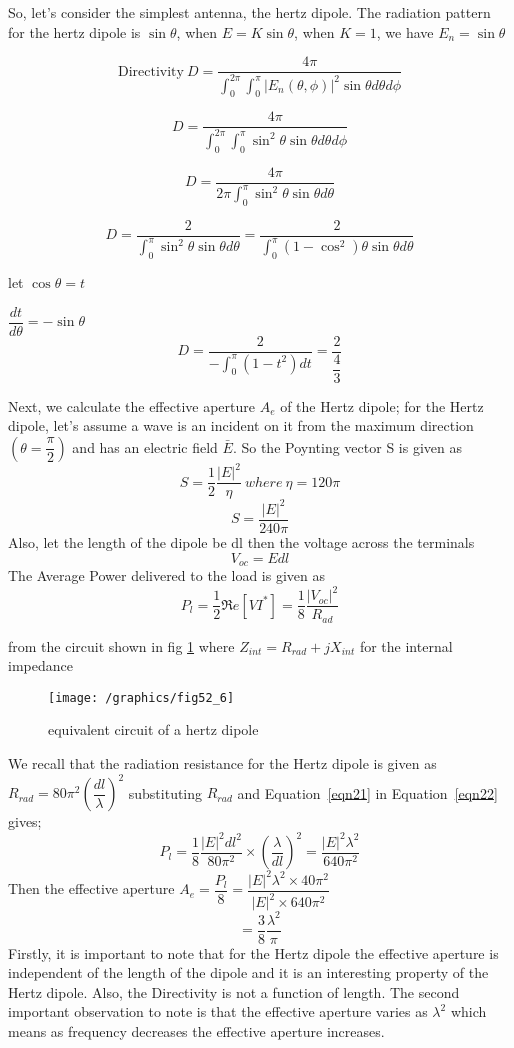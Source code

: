 So, let's consider the simplest antenna, the hertz dipole. The radiation pattern for the hertz dipole is $\sin\theta$, when $E=K\sin\theta$, when $K=1$, we have $E_{n}=\sin\theta$

$$\text{Directivity} \ D=\dfrac{4\pi}{\int_{0}^{2\pi}\int_{0}^{\pi}|E_n(\theta , \phi)|^{2} \sin\theta d\theta d\phi}$$

$$ D=\dfrac{4\pi}{\int_{0}^{2\pi}\int_{0}^{\pi}\sin^{2}\theta \sin\theta d\theta d\phi}$$

$$ D=\dfrac{4\pi}{2\pi\int_{0}^{\pi}\sin^{2}\theta \sin\theta d\theta}$$

$$ D=\dfrac{2}{\int_{0}^{\pi}\sin^{2}\theta \sin\theta d\theta} = \dfrac{2}{\int_{0}^{\pi}(1-\cos^{2})\theta \sin\theta d\theta} $$

let $\cos\theta = t$

$\dfrac{dt}{d\theta}=-\sin\theta$
$$ D=\dfrac{2}{-\int_{0}^{\pi}(1-t^{2})dt} = \dfrac{2}{\dfrac{4}{3}} $$

Next, we calculate the effective aperture $A_{e}$ of the Hertz dipole; for the Hertz dipole, let's assume a wave is an incident on it from the maximum direction $(\theta=\dfrac{\pi}{2})$ and has an electric field $\bar{E}$. So the Poynting vector S is given as 
$$ S= \dfrac{1}{2}\dfrac{|E|^{{2}}}{\eta} \ where \  \eta =120\pi$$
$$ S= \dfrac{|E|^{{2}}}{240\pi}$$
Also, let the length of the dipole be dl then the voltage across the terminals
\begin{equation}
V_{oc}=Edl
\label{eqn21}
\end{equation}
The Average Power delivered to the load is given as
\begin{equation}
P_{l}=\dfrac{1}{2}\Re e [VI^{*}]=\dfrac{1}{8}\dfrac{|V_{oc}|^{2}}{R_{ad}}
\label{eqn22}
\end{equation}

from the circuit shown in fig \ref{fig6} where $Z_{int}=R_{rad}+jX_{int} $ for the internal impedance 
\begin{figure}[h]
\centering
\texttt{[image: /graphics/fig52\_6]}
\caption{equivalent circuit of a hertz dipole}
\label{fig6}	
\end{figure}

We recall that the radiation resistance for the Hertz dipole is given as $R_{rad}=80\pi^{2}(\dfrac{dl}{\lambda})^{2}$ substituting $R_{rad}$ and Equation~\ref{eqn21} in Equation~\ref{eqn22} gives; 
$$	P_{l}=\dfrac{1}{8}\dfrac{|E|^{2}dl^{2}}{80\pi^{2}}\times\left(\dfrac{\lambda}{dl}\right)^{2}= \dfrac{|E|^{2}\lambda^{2}}{640\pi^{2}}$$
Then the effective aperture $A_{e}=\dfrac{P_{l}}{8}=\dfrac{|E|^{2}\lambda^{2}\times40\pi^{2}}{|E|^{2}\times640\pi^{2}}$
$$=\dfrac{3}{8}\dfrac{\lambda^{2}}{\pi}$$
Firstly, it is important to note that for the Hertz dipole the effective aperture is independent of the length of the dipole and it is an interesting property of the Hertz dipole. Also, the Directivity is not a function of length. The second important observation to note is that the effective aperture varies as $\lambda^{2}$ which means as frequency decreases the effective aperture increases.


